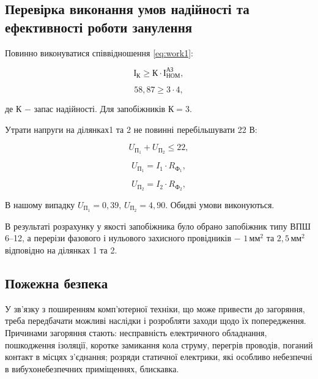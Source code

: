 \subsection{Перевірка виконання умов надійності та ефективності роботи занулення}

Повинно виконуватися співвідношення \ref{eq:work1}:

\[
	\text{І}_{\text{К}} \ge \text{К} \cdot \text{І}^{\text{АЗ}}_{\text{НОМ}},
\]

\[
	58,87 \ge 3 \cdot 4,
\]

\noindent де $\text{К}$ $-$ запас надійності. Для запобіжників $\text{К} = 3$.

\vspace{1.5em}

Утрати напруги на ділянках1 та 2 не повинні перебільшувати 22 В:

\begin{equation}\label{eq:work15}
	U_{\text{П}_{1}} + U_{\text{П}_{2}} \le 22,
\end{equation}

\begin{equation}\label{eq:work16}
	U_{\text{П}_{1}} = I_{1} \cdot R_{\text{Ф}_{1}},
\end{equation}

\begin{equation}\label{eq:work17}
	U_{\text{П}_{2}} = I_{2} \cdot R_{\text{Ф}_{2}},
\end{equation}

\vspace{1.5em}

В нашому випадку $U_{\text{П}_{1}} = 0,39, \, U_{\text{П}_{2}} = 4,90.$ Обидві умови виконуються.

В результаті розрахунку у якості запобіжника було обрано запобіжник типу ВПШ 6–12, а перерізи фазового і нульового захисного провідників $-$ $1 \, \text{мм}^{2}$ та $2,5 \, \text{мм}^{2}$ відповідно на ділянках 1 та 2.

\subsection{Пожежна безпека}

У зв’язку з поширенням комп’ютерної техніки, що може привести до загоряння, треба передбачати можливі наслідки і розробляти заходи щодо їх попередження. Причинами загоряння стають: несправність електричного обладнання, пошкодження ізоляції, коротке замикання кола струму, перегрів проводів, поганий контакт в місцях з’єднання; розряди статичної електрики, які особливо небезпечні в вибухонебезпечних приміщеннях, блискавка.

